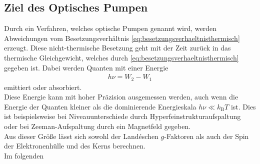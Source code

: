 \documentclass[]{scrartcl}
\begin{document}
\subsection{Ziel des Optisches Pumpen}
Durch ein Verfahren, welches optische Pumpen genannt wird, werden Abweichungen vom Besetzungsverhältnis \ref{eq:besetzungsverhaeltnisthermisch} erzeugt. Diese nicht-thermische Besetzung geht mit der Zeit zurück in das thermische Gleichgewicht, welches durch \ref{eq:besetzungsverhaeltnisthermisch} gegeben ist. Dabei werden Quanten mit einer Energie
\begin{align}
h\nu= W_2 -W_1
\end{align}
emittiert oder absorbiert.\\
Diese Energie kann mit hoher Präzision ausgemessen werden, auch wenn die Energie der Quanten kleiner als die dominierende Energieskala $h\nu \ll k_\text{B}T$ ist. Dies ist beispielsweise bei Niveauunterschiede durch Hyperfeinstrukturaufspaltung oder bei Zeeman-Aufspaltung durch ein Magnetfeld gegeben.\\
Aus dieser Größe lässt sich sowohl der Landéschen $g$-Faktoren als auch der Spin der Elektronenhülle und des Kerns berechnen.\\
Im folgenden
\end{document}
